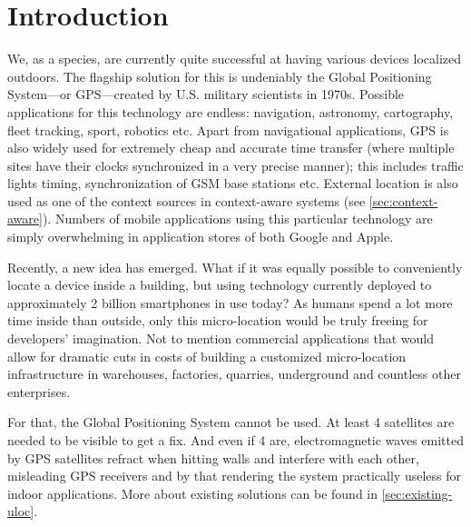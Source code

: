\chapter{Introduction}
\label{cha:introduction}



We, as a species, are currently quite successful at having various devices localized outdoors. The flagship solution for this is undeniably the Global Positioning System---or GPS---created by U.S. military scientists in 1970s. Possible applications for this technology are endless: navigation, astronomy, cartography, fleet tracking, sport, robotics etc. Apart from navigational applications, GPS is also widely used for extremely cheap and accurate time transfer (where multiple sites have their clocks synchronized in a very precise manner); this includes traffic lights timing, synchronization of GSM base stations etc. External location is also used as one of the context sources in context-aware systems (see \cref{sec:context-aware}). Numbers of mobile applications using this particular technology are simply overwhelming in application stores of both Google and Apple.

Recently, a new idea has emerged. What if it was equally possible to conveniently locate a device inside a building, but using technology currently deployed to approximately 2 billion smartphones in use today? As humans spend a lot more time inside than outside, only this micro-location would be truly freeing for developers' imagination. Not to mention commercial applications that would allow for dramatic cuts in costs of building a customized micro-location infrastructure in warehouses, factories, quarries, underground and countless other enterprises.


For that, the Global Positioning System cannot be used. At least 4 satellites are needed to be visible to get a fix. And even if 4 are, electromagnetic waves emitted by GPS satellites refract when hitting walls and interfere with each other, misleading GPS receivers and by that rendering the system practically useless for indoor applications. More about existing solutions can be found in \cref{sec:existing-uloc}.


